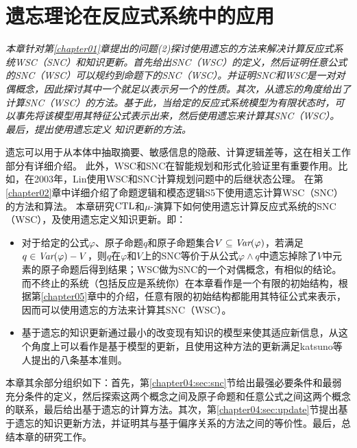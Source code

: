 
\chapter{遗忘理论在反应式系统中的应用}
\label{chapter04}
{\em 本章针对第\ref{chapter01}章提出的问题(2)探讨使用遗忘的方法来解决计算反应式系统WSC（SNC）和知识更新。首先给出SNC（WSC）的定义，然后证明任意公式的SNC（WSC）可以规约到命题下的SNC（WSC）。并证明SNC和WSC是一对对偶概念，因此探讨其中一个就足以表示另一个的性质。其次，从遗忘的角度给出了计算SNC（WSC）的方法。基于此，当给定的反应式系统模型为有限状态时，可以事先将该模型用其特征公式表示出来，然后使用遗忘来计算其SNC（WSC）。
	最后，提出使用遗忘定义
	知识更新的方法。


遗忘可以用于从本体中抽取摘要、敏感信息的隐蔽、计算逻辑差等，这在相关工作部分有详细介绍。
此外，WSC和SNC在智能规划和形式化验证里有重要作用。比如，在2003年，Lin使用WSC和SNC计算规划问题中的后继状态公理。
在第\ref{chapter02}章中详细介绍了命题逻辑和模态逻辑S5下使用遗忘计算WSC（SNC）的方法和算法。
本章研究$\textrm{CTL}$和$\mu$-演算下如何使用遗忘计算反应式系统的SNC（WSC），及使用遗忘定义知识更新。即：
\begin{itemize}
	\item 对于给定的公式$\varphi$、原子命题$q$和原子命题集合$V\subseteq \textit{Var}(\varphi)$，若满足$q \in \textit{Var}(\varphi)-V$，则$q$在$\varphi$和$V$上的SNC等价于从公式$\varphi \wedge q$中遗忘掉除了$V$中元素的原子命题后得到结果；WSC做为SNC的一个对偶概念，有相似的结论。而不终止的系统（包括反应是系统你）在本章看作是一个有限的初始结构，根据第\ref{chapter05}章中的介绍，任意有限的初始结构都能用其特征公式来表示，因而可以使用遗忘的方法来计算其SNC（WSC）。
	\item 基于遗忘的知识更新通过最小的改变现有知识的模型来使其适应新信息，从这个角度上可以看作是基于模型的更新，且使用这种方法的更新满足katsuno等人提出的八条基本准则\cite{katsuno91mendelzon}。
\end{itemize}


本章其余部分组织如下：首先，第\ref{chapter04:sec:snc}节给出最强必要条件和最弱充分条件的定义，然后探索这两个概念之间及原子命题和任意公式之间这两个概念的联系，最后给出基于遗忘的计算方法。其次，第\ref{chapter04:sec:update}节提出基于遗忘的知识更新方法，并证明其与基于偏序关系的方法之间的等价性。最后，总结本章的研究工作。}


